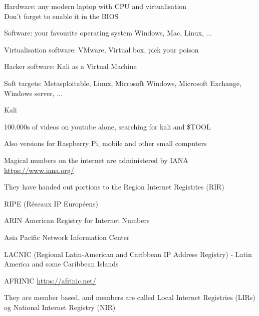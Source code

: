 \documentclass[Screen16to9,17pt]{foils}
\begin{document}


\begin{list2}
\item Hardware: any modern laptop with CPU and virtualisation\\
Don't forget to enable it in the BIOS
\item Software: your favourite operating system Windows, Mac, Linux, ...
\item Virtualisation software: VMware, Virtual box, pick your poison
\item Hacker software: Kali as a Virtual Machine 
\item Soft targets: Metasploitable, Linux, Microsoft Windows, Microsoft Exchange, Windows server, ...
\end{list2}



\begin{list1}
\item  Kali 
\item 100.000s of videos on youtube alone, searching for kali and \$TOOL
\item Also versions for Raspberry Pi, mobile and other small computers
\end{list1}




\begin{list1}
\item Magical numbers on the internet are administered by IANA \url{https://www.iana.org/}
\item They have handed out portions to the Region Internet Registries (RIR)
\begin{list2}
\item RIPE (Réseaux IP Européens)  
\item ARIN American Registry for Internet Numbers 
\item Asia Pacific Network Information Center 
\item LACNIC (Regional Latin-American and Caribbean IP Address Registry) - Latin America and some Caribbean Islands
\item AFRINIC \url{https://afrinic.net/}
\end{list2}
\item They are member based, and members are called Local Internet Registries (LIRs) og National Internet Registry (NIR)
\end{list1}
\end{document}
